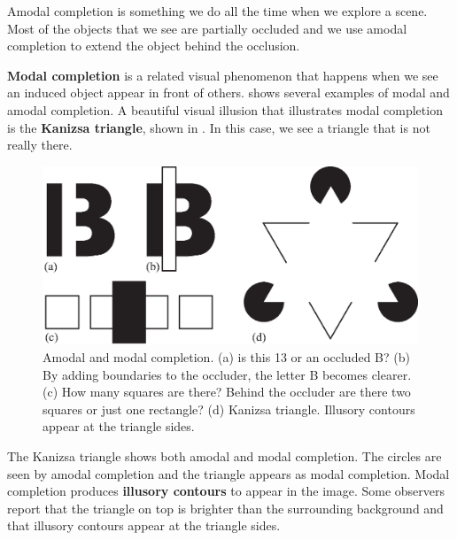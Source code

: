 Amodal completion is something we do all the time when we explore a scene. Most of the objects that we see are partially occluded and we use amodal completion to extend the object behind the occlusion.

    {\bf Modal completion}
is a related visual phenomenon that happens when we see an induced object appear in front of others. \Fig{\ref{fig:kanizsa}} shows several examples of modal and amodal completion. A beautiful visual illusion that illustrates modal completion is the {\bf Kanizsa triangle}, shown in . In this case, we see a triangle that is not really there.


\begin{figure}
    \centerline{
        \includegraphics[width=1\linewidth]{figures/taxonomy/kanizsa.eps}
    }
    \caption{Amodal and modal completion. (a) is this 13 or an occluded B? (b) By adding boundaries to the occluder, the letter B becomes clearer. (c) How many squares are there? Behind the occluder are there two squares or just one rectangle? (d) Kanizsa triangle. Illusory contours appear at the triangle sides.}
    \label{fig:kanizsa}
\end{figure}

The Kanizsa triangle shows both amodal and modal completion. The circles are seen by amodal completion and the triangle appears as modal completion. Modal completion produces {\bf illusory contours} to appear in the image. Some observers report that the triangle on top is brighter than the surrounding background and that illusory contours appear at the triangle sides.




